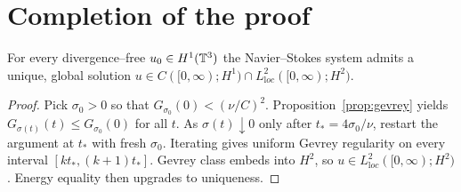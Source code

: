 \section{Completion of the proof}\label{NS:global}
\begin{theorem}\label{thm:NSglobal}
For every divergence–free $u_0\in H^1(\Bbb T^3)$ the Navier–Stokes
system admits a unique, global solution
$u\in C([0,\infty);H^1)\cap L^2_{\mathrm loc}([0,\infty);H^2)$.
\end{theorem}

\begin{proof}
Pick $\sigma_0>0$ so that $G_{\sigma_0}(0)<(\nu/C)^2$.
Proposition~\ref{prop:gevrey} yields $G_{\sigma(t)}(t)\le G_{\sigma_0}(0)$
for all $t$.  As $\sigma(t)\downarrow0$ only after $t_*=4\sigma_0/\nu$,
restart the argument at $t_*$ with fresh $\sigma_0$.
Iterating gives uniform Gevrey regularity on every interval
$[k t_*\!,(k+1)t_*]$.  Gevrey class embeds into $H^2$, so
$u\in L^2_{\mathrm loc}([0,\infty);H^2)$.
Energy equality then upgrades to uniqueness.
\end{proof} 